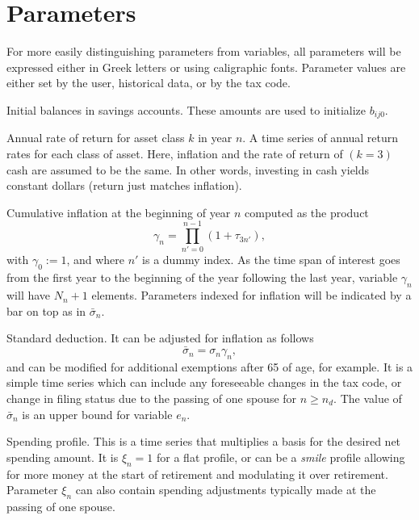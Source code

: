 \documentclass{report}[fleqn,12pt]
\begin{document}
\section{Parameters}
For more easily distinguishing parameters from variables, all parameters will be expressed either in Greek letters
or using caligraphic fonts.
Parameter values are either set by the user, historical data, or by the tax code.
\begin{description}[leftmargin=4em,style=multiline]
\item [$\beta_{ij}$]
	Initial balances in savings accounts. These amounts are used to initialize $b_{ij0}$.
\item [$\tau_{kn}$]
	Annual rate of return for asset class $k$ in year $n$.
	A time series of annual return rates for each class of asset.
	Here, inflation and the rate of return of $(k=3)$ cash are assumed to be the same.
	In other words, investing in cash yields constant dollars (return just matches inflation).
\item [$\gamma_n$]
	Cumulative inflation at the beginning of year $n$ computed as the product
	\begin{equation}
		\gamma_n = \prod_{n' = 0}^{n-1} (1 + \tau_{3n'}),
	\end{equation}
	with $\gamma_0 := 1$, and where $n'$ is a dummy index.
	As the time span of interest goes from the first year to the beginning
        of the year following the last year,
        variable $\gamma_n$ will have $N_n + 1$ elements.
	Parameters indexed for inflation will be indicated by a bar on top as in $\bar{\sigma}_n$.
\item [$\sigma_n$]
	Standard deduction. It can be adjusted for inflation as follows
	\begin{equation}
		\bar\sigma_n = \sigma_n \gamma_n,
	\end{equation}
	and can be modified for additional exemptions after 65 of age, for example.
	It is a simple time series
	which can include any foreseeable changes in the tax code, or change in filing status due to the
	passing of one spouse for $n\ge n_d$.  The value of $\bar{\sigma}_n$ is an upper bound for variable $e_n$.
\item [$\xi_{n}$]
	Spending profile. This is a time series that multiplies a basis for the desired net spending amount.
	It is $\xi_n =1$ for
	a flat profile, or can be a {\em smile} profile allowing for more money at the start
	of retirement and modulating it over retirement. Parameter
	$\xi_n$ can also contain spending adjustments typically made at the passing of one spouse.

\end{description}
\end{document}
